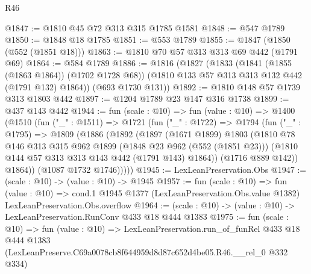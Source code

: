 \begin{lexlean}{R46}
\begin{coremodule}
@1847 := @1810 @45 @72 @313 @315 @1785 @1581
@1848 := @547 @1789
@1850 := @1848 @18 @1785
@1851 := @553 @1789
@1855 := @1847 (@1850 (@552 (@1851 @18)))
@1863 := @1810 @70 @57 @313 @313 @69 @442 (@1791 @69)
@1864 := @584 @1789
@1886 := @1816
    (@1827
      (@1833
        (@1841 (@1855 (@1863 @1864)) (@1702 @1728 @68))
        (@1810 @133 @57 @313 @313 @132 @442 (@1791 @132) @1864))
      (@693 @1730 @131))
@1892 := @1810 @148 @57 @1739 @313 @1803 @442
@1897 := @1204 @1789 @23 @147 @316 @1738
@1899 := @437 @143 @442
@1944 := fun (scale : @10) =>
  fun (value : @10) =>
  @1400
    (@1510
      (fun ("_" : @1511) =>
      @1721
        (fun ("_" : @1722) =>
        @1794
          (fun ("_" : @1795) =>
          @1809
            (@1886
              (@1892
                (@1897
                  (@1671 @1899)
                  @1803
                  (@1810
                    @78
                    @146
                    @313
                    @315
                    @962
                    @1899
                    (@1848 @23 @962 (@552 (@1851 @23)))
                    (@1810 @144 @57 @313 @313 @143 @442 (@1791 @143) @1864))
                  (@1716 @889 @142))
                @1864))
            (@1087 @1732 @1746)))))
@1945 := LexLeanPreservation.Obs
@1947 := (scale : @10) -> (value : @10) -> @1945
@1957 := fun (scale : @10) =>
  fun (value : @10) =>
  cond.{1} @1945 @1377 (LexLeanPreservation.Obs.value @1382) LexLeanPreservation.Obs.overflow
@1964 := (scale : @10) -> (value : @10) -> LexLeanPreservation.RunConv @433 @18 @444 @1383
@1975 := fun (scale : @10) =>
  fun (value : @10) =>
  LexLeanPreservation.run_of_funRel
    @433
    @18
    @444
    @1383
    (LexLeanPreserve.C69a0078cb8f644959d8d87c652d4be05.R46.__rel_0 @332 @334)
\end{coremodule}
\end{lexlean}
